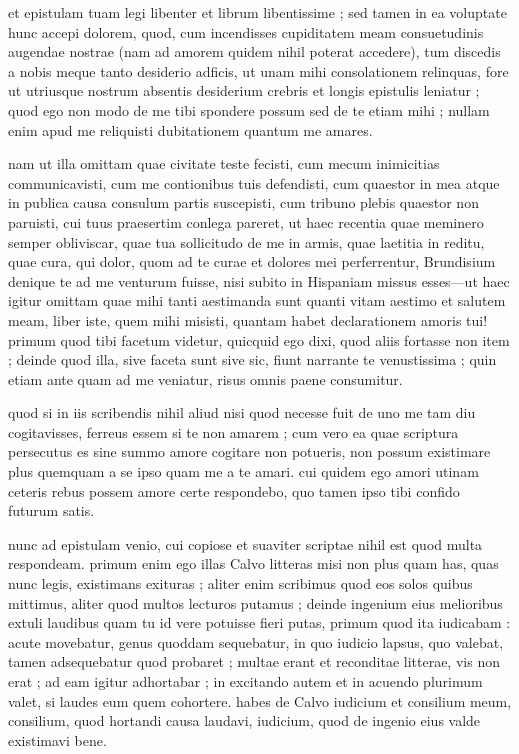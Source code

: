 


 et epistulam tuam legi libenter et librum libentissime ; sed tamen in ea voluptate hunc accepi dolorem, quod, cum incendisses cupiditatem meam consuetudinis augendae nostrae (nam ad amorem quidem nihil poterat accedere), tum discedis a nobis meque tanto desiderio adficis, ut unam mihi consolationem relinquas, fore ut utriusque nostrum absentis desiderium crebris et longis epistulis leniatur ; quod ego non modo de me tibi spondere possum sed de te etiam mihi ; nullam enim apud me reliquisti dubitationem quantum me amares.

 nam ut illa omittam quae civitate teste fecisti, cum mecum inimicitias communicavisti, cum me contionibus tuis defendisti, cum quaestor in mea atque in publica causa consulum partis suscepisti, cum tribuno plebis quaestor non paruisti, cui tuus praesertim conlega pareret, ut haec recentia quae meminero semper obliviscar, quae tua sollicitudo de me in armis, quae laetitia in reditu, quae cura, qui dolor, quom ad te curae et dolores mei perferrentur, Brundisium denique te ad me venturum fuisse, nisi subito in Hispaniam missus esses—ut haec igitur omittam quae mihi tanti aestimanda sunt quanti vitam aestimo et salutem meam, liber iste, quem mihi misisti, quantam habet declarationem amoris tui! primum quod tibi facetum videtur, quicquid ego dixi, quod aliis fortasse non item ; deinde quod illa, sive faceta sunt sive sic, fiunt narrante te venustissima ; quin etiam ante quam ad me veniatur, risus omnis paene consumitur.

 quod si in iis scribendis nihil aliud nisi quod necesse fuit de uno me tam diu cogitavisses, ferreus essem si te non amarem ; cum vero ea quae scriptura persecutus es sine summo amore cogitare non potueris, non possum existimare plus quemquam a se ipso quam me a te amari. cui quidem ego amori utinam ceteris rebus possem amore certe respondebo, quo tamen ipso tibi confido futurum satis.

 nunc ad epistulam venio, cui copiose et suaviter scriptae nihil est quod multa respondeam. primum enim ego illas Calvo litteras misi non plus quam has, quas nunc legis, existimans exituras ; aliter enim scribimus quod eos solos quibus mittimus, aliter quod multos lecturos putamus ; deinde ingenium eius melioribus extuli laudibus quam tu id vere potuisse fieri putas, primum quod ita iudicabam : acute movebatur, genus quoddam sequebatur, in quo iudicio lapsus, quo valebat, tamen adsequebatur quod probaret ; multae erant et reconditae litterae, vis non erat ; ad eam igitur adhortabar ; in excitando autem et in acuendo plurimum valet, si laudes eum quem cohortere. habes de Calvo iudicium et consilium meum, consilium, quod hortandi causa laudavi, iudicium, quod de ingenio eius valde existimavi bene.

